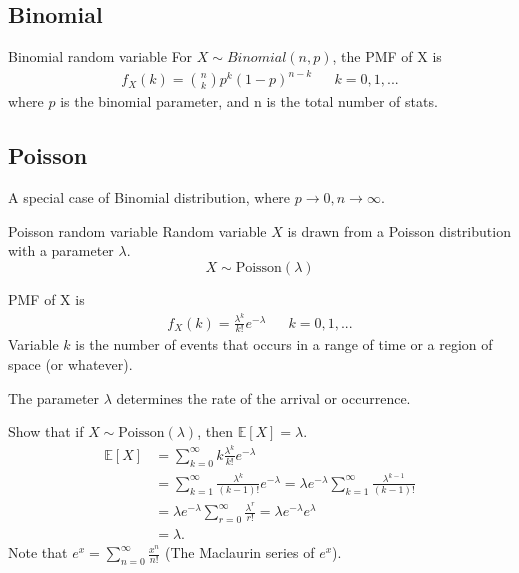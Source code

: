 \documentclass[11pt,a4paper,fleqn]{article}
\numberwithin{equation}{section}
\begin{document}
\subsection{Binomial}

\begin{fact}{Binomial random variable}{}
    For $X \sim Binomial(n,p)$, the PMF of X is
    \begin{align*}
        f_X(k) = \binom{n}{k}p^k(1-p)^{n-k} &&k=0,1,...
    \end{align*}
    where $p$ is the binomial parameter, and n is the total number of stats.
\end{fact}

\subsection{Poisson}
A special case of Binomial distribution, where $p\rightarrow0,n\rightarrow\infty$.

\begin{fact}{Poisson random variable}{}
    Random variable $X$ is drawn from a Poisson distribution with a parameter $\lambda$.
    \begin{equation*}
        X \sim \text{Poisson}(\lambda)
    \end{equation*}
    
    PMF of X is
    \begin{align*}
        f_X(k) =  \frac{\lambda^k}{k!}e^{-\lambda} && k = 0,1,...
    \end{align*}
    Variable $k$ is the number of events that occurs in a range of time or a region of space (or whatever).
    
    The parameter $\lambda$ determines the rate of the arrival or occurrence.
\end{fact}

\begin{exec}
    Show that if $X\sim \text{Poisson}(\lambda)$, then $\mathbb{E}[X]=\lambda$.
    \tcblower
    \begin{align*}
        \mathbb{E}[X]
        &= \sum_{k=0}^{\infty} k\frac{\lambda^k}{k!}e^{-\lambda}\\
        &= \sum_{k=1}^{\infty}\frac{\lambda^k}{(k-1)!}e^{-\lambda} = \lambda e^{-\lambda}\sum_{k=1}^{\infty}\frac{\lambda^{k-1}}{(k-1)!}\\
        &= \lambda e^{-\lambda}\sum_{r=0}^{\infty}\frac{\lambda^{r}}{r!} = \lambda e^{-\lambda}e^{\lambda}\\
        &= \lambda.
    \end{align*}
    Note that $e^x=\sum_{n=0}^{\infty}\frac{x^n}{n!}$ (The Maclaurin series of $e^x$).
\end{exec}
\end{document}
